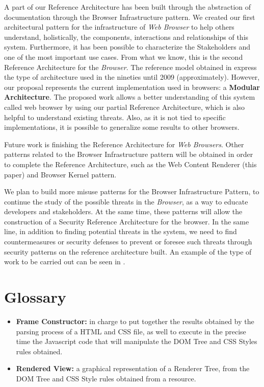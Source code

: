 \documentclass[prodmode,acmtecs]{acmsmall}
\begin{document}
A part of our Reference Architecture has been built through the abstraction of documentation through the Browser Infrastructure pattern. We created our first architectural pattern for the infrastructure of \textit{Web Browser} to help others understand, holistically, the components, interactions and relationships of this system. Furthermore, it has been possible to characterize the Stakeholders and one of the most important use cases. From what we know, this is the second Reference Architecture for the \textit{Browser}. The reference model obtained in \cite{2005-grosskurth-browser-refarch} express the type of architecture used in the nineties until 2009 (approximately). However, our proposal represents the current implementation used in browsers: a \textbf{Modular Architecture}. The proposed work allows a better understanding of this system called web browser by using our partial Reference Architecture, which is also helpful to understand existing threats. Also, as it is not tied to specific implementations, it is possible to generalize some results to other browsers. 

Future work is finishing the Reference Architecture for \textit{Web Browsers}. Other patterns related to the Browser Infrastructure pattern will be obtained in order to complete the Reference Architecture, such as the Web Content Renderer (this paper) and Browser Kernel pattern. 

We plan to build more \cite{silva2015b} misuse patterns for the Browser Infrastructure Pattern, to continue the study of the possible threats in the \textit{Browser}, as a way to educate developers and stakeholders. At the same time, these patterns will allow the construction of a Security Reference Architecture for the browser. In the same line, in addition to finding potential threats in the system, we need to find countermeasures or security defenses to prevent or foresee such threats through security patterns on the reference architecture built. An example of the type of work to be carried out can be seen in \cite{Fernandez2015}.


\section{Glossary}
\begin{itemize}
  \item \textbf{Frame Constructor:} in charge to put together the results obtained by the parsing process of a HTML and CSS file, as well to execute in the precise time the Javascript code that will manipulate the DOM Tree and CSS Styles rules obtained. 
  \item \textbf{Rendered View:} a graphical representation of a Renderer Tree, from the DOM Tree and CSS Style rules obtained from a resource.
\end{itemize}


  

\end{document}
